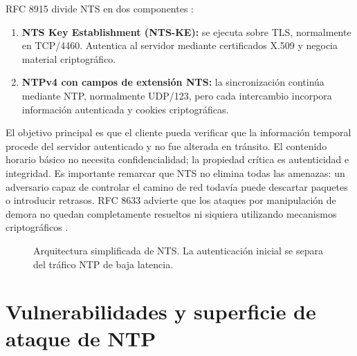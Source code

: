 \documentclass[11pt,a4paper]{article}
\newcommand{\nts}{\textsc{NTS}}
\begin{document}
RFC 8915 divide \nts{} en dos componentes \cite{rfc8915}:

\begin{enumerate}
    \item \textbf{NTS Key Establishment (NTS-KE):} se ejecuta sobre TLS, normalmente en TCP/4460. Autentica al servidor mediante certificados X.509 y negocia material criptográfico.
    \item \textbf{NTPv4 con campos de extensión NTS:} la sincronización continúa mediante NTP, normalmente UDP/123, pero cada intercambio incorpora información autenticada y cookies criptográficas.
\end{enumerate}

El objetivo principal es que el cliente pueda verificar que la información temporal procede del servidor autenticado y no fue alterada en tránsito. El contenido horario básico no necesita confidencialidad; la propiedad crítica es autenticidad e integridad. Es importante remarcar que \nts{} no elimina todas las amenazas: un adversario capaz de controlar el camino de red todavía puede descartar paquetes o introducir retrasos. RFC 8633 advierte que los ataques por manipulación de demora no quedan completamente resueltos ni siquiera utilizando mecanismos criptográficos \cite{rfc8633}.

\begin{figure}[ht]
\centering
{}
\caption{Arquitectura simplificada de NTS. La autenticación inicial se separa del tráfico NTP de baja latencia.}
\end{figure}

\section{Vulnerabilidades y superficie de ataque de NTP}
\end{document}
